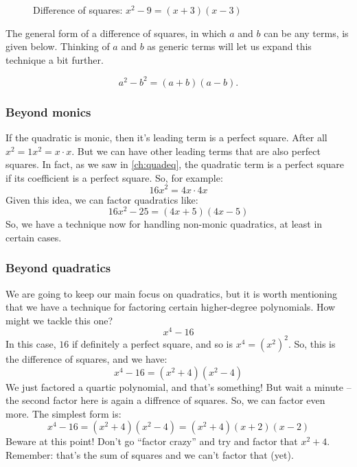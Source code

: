 \begin{figure}
\caption{Difference of squares: $x^2-9=(x+3)(x-3)$}
\label{fig:diffsquares}
\end{figure}

The general form of a difference of squares, in which $a$ and $b$ can be any terms, is given below. Thinking of $a$ and $b$ as generic terms will let us expand this technique a bit further.

\begin{boxdef}
\[a^2 - b^2= (a + b)(a - b).\]
\end{boxdef}

\subsubsection{Beyond monics}

If the quadratic is monic, then it's leading term is a perfect square. After all $x^2 = 1x^2 = x \cdot x$. But we can have other leading terms that are also perfect squares. In fact, as we saw in \cref{ch:quadeq}, the quadratic term is a perfect square if its coefficient is a perfect square. So, for example:
\[16x^2 = 4x \cdot 4x\]
Given this idea, we can factor quadratics like:
\[16x^2 - 25 = (4x+5)(4x-5)\]
So, we have a technique now for handling non-monic quadratics, at least in certain cases.

\subsubsection{Beyond quadratics}

We are going to keep our main focus on quadratics, but it is worth mentioning that we have a technique for factoring certain higher-degree polynomials. How might we tackle this one?
\[x^4 - 16\]
In this case, $16$ if definitely a perfect square, and so is $x^4 = (x^2)^2$. So, this is the difference of squares, and we have:
\[x^4 - 16 = (x^2+4)(x^2-4)\]
We just factored a quartic polynomial, and that's something! But wait a minute -- the second factor here is again a diffrence of squares. So, we can factor even more. The simplest form is:
\[x^4 - 16 = (x^2+4)(x^2-4) = (x^2+4)(x+2)(x-2)\]
Beware at this point! Don't go ``factor crazy'' and try and factor that $x^2 + 4$. Remember: that's the sum of squares and we can't factor that (yet).

